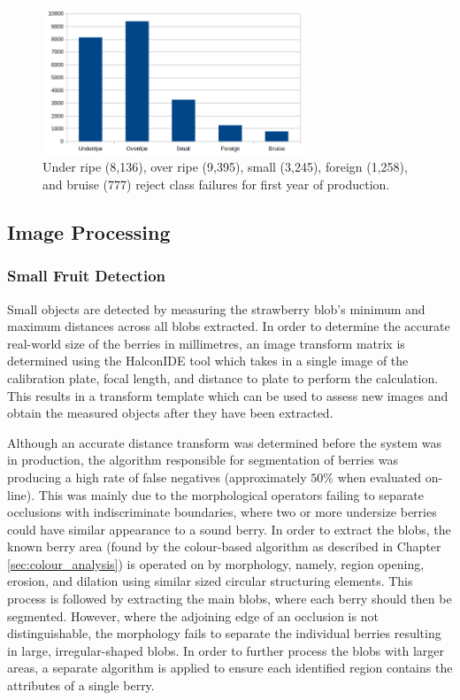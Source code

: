 \documentclass[fleqn,twoside,12pt]{report}
\begin{document}
\begin{figure}[h]
	\centering
	\includegraphics[width=0.7\textwidth]{second_year_cat.png}
	\caption{Under ripe (8,136), over ripe (9,395), small (3,245), foreign (1,258), and bruise (777) reject class failures for first year of production.}
	\label{fig:second_year_breakdown}
\end{figure}




\subsection{Image Processing}

\subsubsection{Small Fruit Detection}


Small objects are detected by measuring the strawberry blob's minimum and maximum distances across all blobs extracted. In order to determine the accurate real-world size of the berries in millimetres, an image transform matrix is determined using the Halcon\texttrademark IDE tool which takes in a single image of the calibration plate, focal length, and distance to plate to perform the calculation. This results in a transform template which can be used to assess new images and obtain the measured objects after they have been extracted. 

Although an accurate distance transform was determined before the system was in production, the algorithm responsible for segmentation of berries was producing a high rate of false negatives (approximately $50\%$ when evaluated on-line). This was mainly due to the morphological operators failing to separate occlusions with indiscriminate boundaries, where two or more undersize berries could have similar appearance to a sound berry. In order to extract the blobs, the known berry area (found by the colour-based algorithm as described in Chapter \ref{sec:colour_analysis}) is operated on by morphology, namely, region opening, erosion, and dilation using similar sized circular structuring elements. This process is followed by extracting the main blobs, where each berry should then be segmented. However, where the adjoining edge of an occlusion is not distinguishable, the morphology fails to separate the individual berries resulting in large, irregular-shaped blobs. In order to further process the blobs with larger areas, a separate algorithm is applied to ensure each identified region contains the attributes of a single berry.
\end{document}
